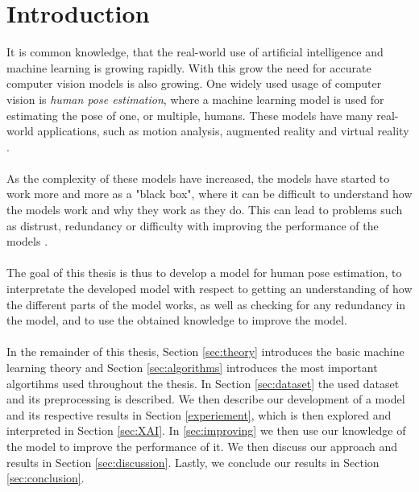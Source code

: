 \documentclass[./main.tex]{subfiles}
\begin{document}
\section{Introduction}
It is common knowledge, that the real-world use of artificial intelligence and machine learning is growing rapidly. With this grow the need for accurate computer vision models is also growing. One widely used usage of computer vision is \textit{human pose estimation}, where a machine learning model is used for estimating the pose of one, or multiple, humans. These models have many real-world applications, such as motion analysis, augmented reality and virtual reality \cite{survey_2}.
\\
\\
As the complexity of these models have increased, the models have started to work more and more as a "black box", where it can be difficult to understand how the models work and why they work as they do. This can lead to problems such as distrust, redundancy or difficulty with improving the performance of the models \cite{Selvaraju}.
\\
\\
The goal of this thesis is thus to develop a model for human pose estimation, to interpretate the developed model with respect to getting an understanding of how the different parts of the model works, as well as checking for any redundancy in the model, and to use the obtained knowledge to improve the model.
\\
\\
In the remainder of this thesis, Section \ref{sec:theory} introduces the basic machine learning theory and Section \ref{sec:algorithms} introduces the most important algortihms used throughout the thesis. In Section \ref{sec:dataset} the used dataset and its preprocessing is described. We then describe our development of a model and its respective results in Section \ref{experiement}, which is then explored and interpreted in Section \ref{sec:XAI}. In \ref{sec:improving} we then use our knowledge of the model to improve the performance of it. We then discuss our approach and results in Section \ref{sec:discussion}. Lastly, we conclude our results in Section \ref{sec:conclusion}.
\end{document}
